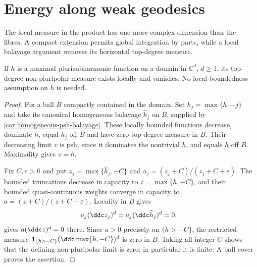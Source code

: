 \section{Energy along weak geodesics}
\label{sec:geodesic-energy-linearity}
The local measure in the product has one more complex dimension than the fibres. A compact extension permits global integration by parts, while a local balayage argument removes its horizontal top-degree measure.

\begin{lemma}\label{lem:unbounded-maximal-nonpluripolar-zero}
If $h$ is a maximal plurisubharmonic function on a domain in $\mathbb C^d$, $d\geq1$, its top-degree non-pluripolar measure exists locally and vanishes. No local boundedness assumption on $h$ is needed.
\end{lemma}
\begin{proof}
Fix a ball $B$ compactly contained in the domain. Set $h_j=\max\{h,-j\}$ and take its canonical homogeneous balayage $\widehat h_j$ on $B$, supplied by \cref{cor:homogeneous-psh-balayage}. These locally bounded functions decrease, dominate $h$, equal $h_j$ off $B$ and have zero top-degree measure in $B$. Their decreasing limit $v$ is psh, since it dominates the nontrivial $h$, and equals $h$ off $B$. Maximality gives $v=h$.

Fix $C,\varepsilon>0$ and put $z_j=\max\{\widehat h_j,-C\}$ and $a_j=(z_j+C)/(z_j+C+\varepsilon)$. The bounded truncations decrease in capacity to $z=\max\{h,-C\}$, and their bounded quasi-continuous weights converge in capacity to $a=(z+C)/(z+C+\varepsilon)$. Locality in $B$ gives
\[
 a_j(\ddc z_j)^d=a_j(\ddc\widehat h_j)^d=0.
\]
 gives $a(\ddc z)^d=0$ there. Since $a>0$ precisely on $\{h>-C\}$, the restricted measure $\mathbf1_{\{h>-C\}}(\ddc\max\{h,-C\})^d$ is zero in $B$. Taking all integer $C$ shows that the defining non-pluripolar limit is zero; in particular it is finite. A ball cover proves the assertion.
\end{proof}

